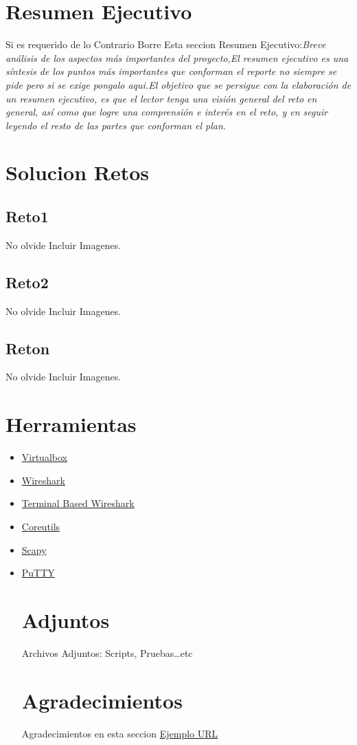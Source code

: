 \documentclass[a4paper]{article}
\begin{document}
\section{Resumen Ejecutivo}Si es requerido de lo Contrario Borre Esta seccion Resumen Ejecutivo:\textit{Breve análisis de los aspectos más importantes del proyecto,El resumen ejecutivo es una s\'intesis de los puntos más importantes que conforman el reporte no siempre se pide pero si se exige pongalo aqui.El objetivo que se persigue con la elaboración de un resumen ejecutivo, es que el lector tenga una visión general del reto en general, así como que logre una comprensión e interés en el reto, y en seguir leyendo el resto de las partes que conforman el plan.}
\section{Solucion Retos \label{SolRet}}
\subsection{Reto1}
No olvide Incluir Imagenes.

\subsection{Reto2}
No olvide Incluir Imagenes.
\subsection{Reton}
No olvide Incluir Imagenes.
\clearpage
\newpage
\section{Herramientas \label{Herramientas}}
\begin{itemize}
\item \href{http://virtualbox.org}{Virtualbox}
\item \href{www.wireshark.org}{Wireshark}
\item \href{www.wireshark.org}{Terminal Based Wireshark}
\item \href{http://www.gnu.org/software/coreutils/}{Coreutils}
\item \href{http://www.secdev.org/projects/scapy/}{Scapy}
\item \href{http://www.chiark.greenend.org.uk/~sgtatham/putty/}{PuTTY}
\clearpage
\newpage
\section{Adjuntos}
Archivos Adjuntos: Scripts, Pruebas\ldots etc 
\clearpage
\newpage
\section{Agradecimientos}
Agradecimientos en esta seccion \href{http://www.ejemplourl.org}{Ejemplo URL} 

\end{itemize}
\end{document}
